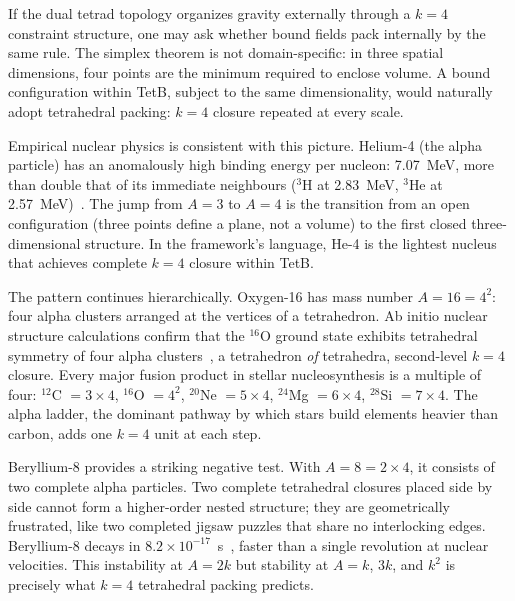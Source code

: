 \documentclass[aps,prd,preprint,superscriptaddress,showpacs,preprintnumbers,amsmath,amssymb,nofootinbib]{revtex4-2}
\begin{document}
If the dual tetrad topology organizes gravity externally through a $k = 4$ constraint structure, one may ask whether bound fields pack internally by the same rule. The simplex theorem is not domain-specific: in three spatial dimensions, four points are the minimum required to enclose volume. A bound configuration within TetB, subject to the same dimensionality, would naturally adopt tetrahedral packing: $k = 4$ closure repeated at every scale.

Empirical nuclear physics is consistent with this picture. Helium-4 (the alpha particle) has an anomalously high binding energy per nucleon: 7.07~MeV, more than double that of its immediate neighbours ($^3$H at 2.83~MeV, $^3$He at 2.57~MeV)~\cite{audi2003}. The jump from $A = 3$ to $A = 4$ is the transition from an open configuration (three points define a plane, not a volume) to the first closed three-dimensional structure. In the framework's language, He-4 is the lightest nucleus that achieves complete $k = 4$ closure within TetB.

The pattern continues hierarchically. Oxygen-16 has mass number $A = 16 = 4^2$: four alpha clusters arranged at the vertices of a tetrahedron. Ab initio nuclear structure calculations confirm that the $^{16}$O ground state exhibits tetrahedral symmetry of four alpha clusters~\cite{epelbaum2012}, a tetrahedron \emph{of} tetrahedra, second-level $k = 4$ closure. Every major fusion product in stellar nucleosynthesis is a multiple of four: $^{12}$C $= 3 \times 4$, $^{16}$O $= 4^2$, $^{20}$Ne $= 5 \times 4$, $^{24}$Mg $= 6 \times 4$, $^{28}$Si $= 7 \times 4$. The alpha ladder, the dominant pathway by which stars build elements heavier than carbon, adds one $k = 4$ unit at each step.

Beryllium-8 provides a striking negative test. With $A = 8 = 2 \times 4$, it consists of two complete alpha particles. Two complete tetrahedral closures placed side by side cannot form a higher-order nested structure; they are geometrically frustrated, like two completed jigsaw puzzles that share no interlocking edges. Beryllium-8 decays in $8.2 \times 10^{-17}$~s~\cite{tilley2004}, faster than a single revolution at nuclear velocities. This instability at $A = 2k$ but stability at $A = k$, $3k$, and $k^2$ is precisely what $k = 4$ tetrahedral packing predicts.
\end{document}
